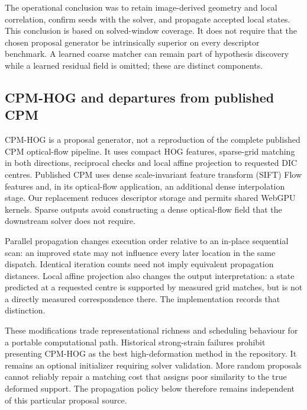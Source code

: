 The operational conclusion was to retain image-derived geometry and local correlation, confirm seeds with the solver, and propagate accepted local states. This conclusion is based on solved-window coverage. It does not require that the chosen proposal generator be intrinsically superior on every descriptor benchmark. A learned coarse matcher can remain part of hypothesis discovery while a learned residual field is omitted; these are distinct components.

\subsection{CPM-HOG and departures from published CPM}
CPM-HOG is a proposal generator, not a reproduction of the complete published CPM optical-flow pipeline. It uses compact HOG features, sparse-grid matching in both directions, reciprocal checks and local affine projection to requested DIC centres. Published CPM uses dense scale-invariant feature transform (SIFT) Flow features and, in its optical-flow application, an additional dense interpolation stage. Our replacement reduces descriptor storage and permits shared WebGPU kernels. Sparse outputs avoid constructing a dense optical-flow field that the downstream solver does not require.

Parallel propagation changes execution order relative to an in-place sequential scan: an improved state may not influence every later location in the same dispatch. Identical iteration counts need not imply equivalent propagation distances. Local affine projection also changes the output interpretation: a state predicted at a requested centre is supported by measured grid matches, but is not a directly measured correspondence there. The implementation records that distinction.

These modifications trade representational richness and scheduling behaviour for a portable computational path. Historical strong-strain failures prohibit presenting CPM-HOG as the best high-deformation method in the repository. It remains an optional initializer requiring solver validation. More random proposals cannot reliably repair a matching cost that assigns poor similarity to the true deformed support. The propagation policy below therefore remains independent of this particular proposal source.

